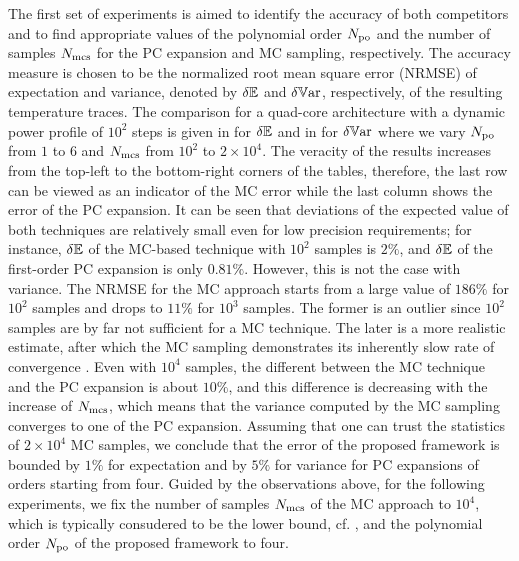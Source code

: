 


The first set of experiments is aimed to identify the accuracy of both competitors and to find appropriate values of the polynomial order ${N_\text{po}}$ and the number of samples $N_\text{mcs}$ for the PC expansion and MC sampling, respectively. The accuracy measure is chosen to be the normalized root mean square error (NRMSE) of expectation and variance, denoted by $\delta\mathbb{E}$ and $\delta\mathbb{V}\text{ar}$, respectively, of the resulting temperature traces. The comparison for a quad-core architecture with a dynamic power profile of $10^2$ steps is given in  for $\delta\mathbb{E}$ and in  for $\delta\mathbb{V}\text{ar}$ where we vary ${N_\text{po}}$ from $1$ to $6$ and $N_\text{mcs}$ from $10^2$ to $2 \times 10^4$. The veracity of the results increases from the top-left to the bottom-right corners of the tables, therefore, the last row can be viewed as an indicator of the MC error while the last column shows the error of the PC expansion. It can be seen that deviations of the expected value of both techniques are relatively small even for low precision requirements; for instance, $\delta\mathbb{E}$ of the MC-based technique with $10^2$ samples is $2\%$, and $\delta\mathbb{E}$ of the first-order PC expansion is only $0.81\%$. However, this is not the case with variance. The NRMSE for the MC approach starts from a large value of $186\%$ for $10^2$ samples and drops to $11\%$ for $10^3$ samples. The former is an outlier since $10^2$ samples are by far not sufficient for a MC technique. The later is a more realistic estimate, after which the MC sampling demonstrates its inherently slow rate of convergence \cite{xiu2009, maitre2010}. Even with $10^4$ samples, the different between the MC technique and the PC expansion is about $10\%$, and this difference is decreasing with the increase of $N_\text{mcs}$, which means that the variance computed by the MC sampling converges to one of the PC expansion. Assuming that one can trust the statistics of $2 \times 10^4$ MC samples, we conclude that the error of the proposed framework is bounded by $1\%$ for expectation and by $5\%$ for variance for PC expansions of orders starting from four. Guided by the observations above, for the following experiments, we fix the number of samples $N_\text{mcs}$ of the MC approach to $10^4$, which is typically consudered to be the lower bound, cf. \cite{xiu2009, bhardwaj2006}, and the polynomial order ${N_\text{po}}$ of the proposed framework to four.

